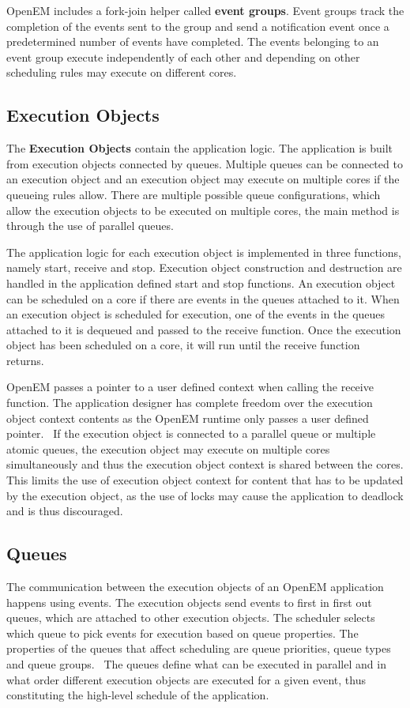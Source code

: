 OpenEM includes a fork-join helper called \textbf{event groups}. Event groups track the completion of the events sent to the group and send a notification event once a predetermined number of events have completed. The events belonging to an event group execute independently of each other and depending on other scheduling rules may execute on different cores. \cite{openemintro}

\subsection{Execution Objects}
\label{subsec:eos}
The \textbf{Execution Objects} contain the application logic. The application is built from execution objects connected by queues. Multiple queues can be connected to an execution object and an execution object may execute on multiple cores if the queueing rules allow. There are multiple possible queue configurations, which allow the execution objects to be executed on multiple cores, the main method is through the use of parallel queues.~\cite{openemintro}

The application logic for each execution object is implemented in three functions, namely start, receive and stop. Execution object construction and destruction are handled in the application defined start and stop functions. An execution object can be scheduled on a core if there are events in the queues attached to it. When an execution object is scheduled for execution, one of the events in the queues attached to it is dequeued and passed to the receive function. Once the execution object has been scheduled on a core, it will run until the receive function returns.~\cite{openemintro}

OpenEM passes a pointer to a user defined context when calling the receive function. The application designer has complete freedom over the execution object context contents as the OpenEM runtime only passes a user defined pointer.~\cite{openemintro} If the execution object is connected to a parallel queue or multiple atomic queues, the execution object may execute on multiple cores simultaneously and thus the execution object context is shared between the cores. This limits the use of execution object context for content that has to be updated by the execution object, as the use of locks may cause the application to deadlock and is thus discouraged.

\subsection{Queues}
\label{subsec:queues}
The communication between the execution objects of an OpenEM application happens using events. The execution objects send events to first in first out queues, which are attached to other execution objects. The scheduler selects which queue to pick events for execution based on queue properties. The properties of the queues that affect scheduling are queue priorities, queue types and queue groups.~\cite{openemintro} The queues define what can be executed in parallel and in what order different execution objects are executed for a given event, thus constituting the high-level schedule of the application.

